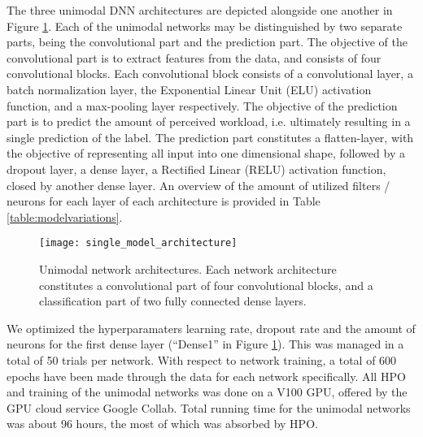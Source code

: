 \documentclass[fleqn,11pt]{paper}
\begin{document}
The three unimodal DNN architectures are depicted alongside one another in Figure \ref{fig:singlearchitecture}. Each of the unimodal networks may be distinguished by two separate parts, being the convolutional part and the prediction part.  The objective of the convolutional part is to extract features from the data, and consists of four convolutional blocks. Each convolutional block consists of a convolutional layer, a batch normalization layer, the Exponential Linear Unit (ELU) activation function, and a max-pooling layer respectively. The objective of the prediction part is to predict the amount of perceived workload,  i.e. ultimately resulting in a single prediction of the label. The prediction part constitutes a flatten-layer,  with the objective of representing all input into one dimensional shape, followed by a dropout layer, a dense layer, a Rectified Linear (RELU) activation function, closed by another dense layer. An overview of the amount of utilized filters / neurons for each layer of each architecture is provided in Table \ref{table:modelvariations}. 

\vspace{7mm}
\begin{figure}[h]
\centering
\texttt{[image: single\_model\_architecture]}
\caption{Unimodal network architectures. Each network architecture constitutes a convolutional part of four convolutional blocks, and a classification part of two fully connected dense layers. }\label{fig:singlearchitecture}
\end{figure}

\newpage
We optimized the hyperparamaters learning rate, dropout rate and the amount of neurons for the first dense layer (\enquote{Dense1} in Figure \ref{fig:singlearchitecture}). This was managed in a total of 50 trials per network.  With respect to network training, a total of 600 epochs have been made through the data for each network specifically. All HPO and training of the unimodal networks was done on a V100 GPU,  offered by the GPU cloud service Google Collab.  Total running time for the unimodal networks was about 96 hours, the most of which was absorbed by HPO. 
\end{document}
